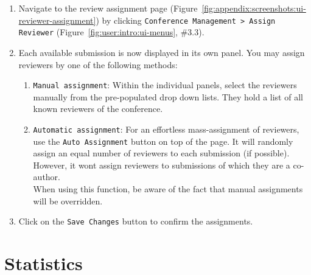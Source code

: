 \documentclass[nochapterpage,nopartpage,noheadingspace,numbersubsubsec,bigchapter,colorback,accentcolor=tud9c,10pt]{tudreport}
\begin{document}
        \begin{enumerate}
            \setlength\itemsep{0em}
            \item Navigate to the review assignment page (Figure~\ref{fig:appendix:screenshots:ui-reviewer-assignment}) by clicking \texttt{Conference Management > Assign Reviewer} (Figure~\ref{fig:user:intro:ui-menus}, \#3.3).
            \item Each available submission is now displayed in its own panel. You may assign reviewers by one of the following methods:
            \begin{enumerate}
                \item \texttt{Manual assignment}: Within the individual panels, select the reviewers manually from the pre-populated drop down lists. They hold a list of all known reviewers of the conference.
                \item \texttt{Automatic assignment}: For an effortless mass-assignment of reviewers, use the \texttt{Auto Assignment} button on top of the page. It will randomly assign an equal number of reviewers to each submission (if possible). However, it wont assign reviewers to submissions of which they are a co-author.\\
                When using this function, be aware of the fact that manual assignments will be overridden.
            \end{enumerate}
            \item Click on the \texttt{Save Changes} button to confirm the assignments.
        \end{enumerate}

  \section{Statistics}
  \label{ch:user:chair:statistics}
\end{document}

